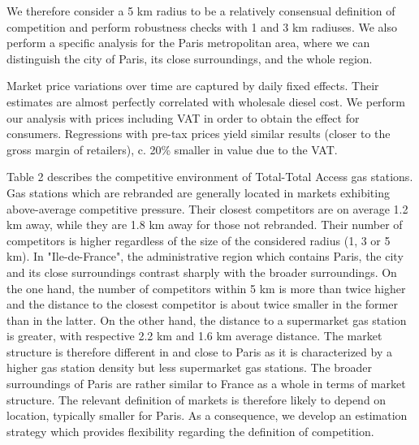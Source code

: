 \documentclass[english]{article}
\begin{document}
We therefore consider a 5 km radius to be a relatively consensual definition of competition and perform robustness checks with 1 and 3 km radiuses. We also perform a specific analysis for the Paris metropolitan area, where we can distinguish the city of Paris, its close surroundings, and the whole region.

Market price variations over time are captured by daily fixed effects. Their estimates are almost perfectly correlated with wholesale diesel cost. We perform our analysis with prices including VAT in order to obtain the effect for consumers. Regressions with pre-tax prices yield similar results (closer to the gross margin of retailers), c. 20\% smaller in value due to the VAT.
\medskip{}

Table 2 describes the competitive environment of Total-Total Access gas stations. Gas stations which are rebranded are generally located in markets exhibiting above-average competitive pressure. Their closest competitors are on average 1.2 km away, while they are 1.8 km away for those not rebranded. Their number of competitors is higher regardless of the size of the considered radius (1, 3 or 5 km). In "Ile-de-France", the administrative region which contains Paris, the city and its close surroundings contrast sharply with the broader surroundings. On the one hand, the number of competitors within 5 km is more than twice higher and the distance to the closest competitor is about twice smaller in the former than in the latter. On the other hand, the distance to a supermarket gas station is greater, with respective 2.2 km and 1.6 km average distance. The market structure is therefore different in and close to Paris as it is characterized by a higher gas station density but less supermarket gas stations. The broader surroundings of Paris are rather similar to France as a whole in terms of market structure. The relevant definition of markets is therefore likely to depend on location, typically smaller for Paris. As a consequence, we develop an estimation strategy which provides flexibility regarding the definition of competition.
\medskip{}
\end{document}
